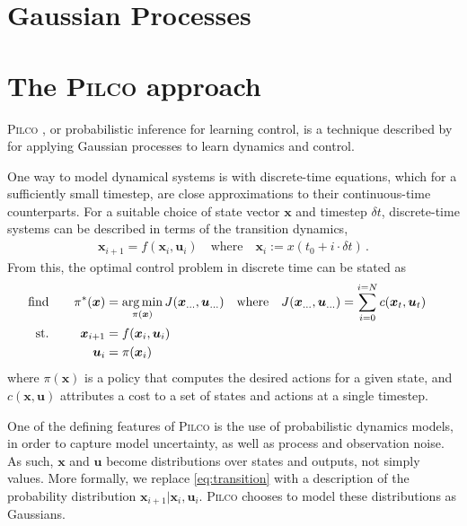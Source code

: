 \documentclass[main.tex]{subfiles}
\begin{document}
\section{Gaussian Processes}

\section{The \textsc{Pilco} approach}

	\textsc{Pilco} \cite{pilco}, or probabilistic inference for learning control, is a technique described by \citeauthor{pilco} for applying Gaussian processes to learn dynamics and control.

	One way to model dynamical systems is with discrete-time equations, which for a sufficiently small timestep, are close approximations to their continuous-time counterparts.
	For a suitable choice of state vector $\bm{x}$ and timestep $\delta t$, discrete-time systems can be described in terms of the transition dynamics,
	\begin{align}
		\bm{x}_{i + 1} = f(\bm{x}_{i}, \bm{u}_{i}) \quad \text{where} \quad \bm{x}_{i} := x(t_0 + i\cdot\delta t)\,. \label{eq:transition}
	\end{align}
	From this, the optimal control problem in discrete time can be stated as
	\begin{alignat}{2}
		\text{find}&& \quad
			\pi^*(\bm{x}) &= \operatorname*{arg\,min}_{\pi(\bm{x})}
				J(\bm{x}_{...}, \bm{u}_{...})
				\quad \text{where} \quad
				J(\bm{x}_{...}, \bm{u}_{...}) = \sum_{i=0}^{i=N} c(\bm{x}_t, \bm{u}_t)\quad \\
		\text{st.}&& \quad
			\bm{x}_{i+1} &= f(\bm{x}_{i}, \bm{u}_{i}) \\
		&&
			\bm{u}_i &= \pi(\bm{x}_i)\,
	\end{alignat}
	where $\pi(\bm{x})$ is a policy that computes the desired actions for a given state, and $c(\bm{x}, \bm{u})$ attributes a cost to a set of states and actions at a single timestep.

	One of the defining features of \textsc{Pilco} is the use of probabilistic dynamics models, in order to capture model uncertainty, as well as process and observation noise. As such, $\bm{x}$ and $\bm{u}$ become distributions over states and outputs, not simply values\footnotemark.
	More formally, we replace \cref{eq:transition} with a description of the probability distribution $\bm{x}_{i+1}|\bm{x}_i,\bm{u}_{i}$.
	\textsc{Pilco} chooses to model these distributions as Gaussians.

\end{document}
